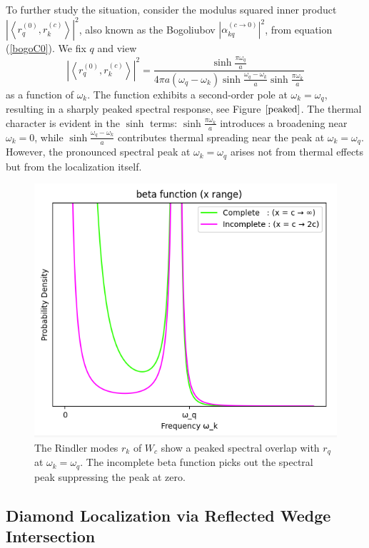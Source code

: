 \documentclass[12pt,a4paper]{article}
\begin{document}
To further study the situation, consider the modulus squared inner product $\left|\left<r_q^{(0)}, r_k^{(c)} \right>\right|^2$, also known as the Bogoliubov $\left|\alpha^{(c \rightarrow 0)}_{kq}\right|^2$, from equation (\ref{bogoC0}).  We fix $q$ and view
\begin{equation}
  \left|\left<r_q^{(0)}, r_k^{(c)} \right>\right|^2 = \frac{\sinh \frac{\pi \omega_q}{a}}{4\pi a (\omega_q - \omega_k) \sinh \frac{\omega_q - \omega_k}{a} \sinh \frac{\pi \omega_k}{a}}
\end{equation}
as a function of $\omega_k$. The function exhibits a second-order pole at $\omega_k = \omega_q$, resulting in a sharply peaked spectral response, see Figure $\ref{peaked}$. The thermal character is evident in the $\sinh$ terms: $\sinh \frac{\pi \omega_k}{a}$ introduces a broadening near $\omega_k = 0$, while $\sinh \frac{\omega_q - \omega_k}{a}$ contributes thermal spreading near the peak at $\omega_k = \omega_q$. However, the pronounced spectral peak at $\omega_k = \omega_q$ arises not from thermal effects but from the localization itself.

\begin{figure}[h]
  \centering
\includegraphics[scale=0.6]{peaked.png}
\caption{The Rindler modes $r_k$ of $W_c$ show a peaked spectral overlap with $r_q$ at $\omega_k = \omega_q$. The incomplete beta function picks out the spectral peak suppressing the peak at zero.}
\label{peaked}
\end{figure}

\subsection{Diamond Localization via Reflected Wedge Intersection}
\end{document}
